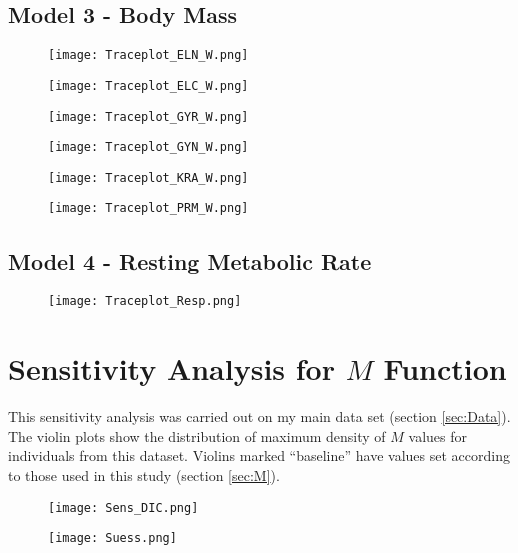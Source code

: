 \documentclass[12pt, titlepage]{article}
\begin{document}
\subsection{Model 3 - Body Mass}

\begin{figure}[H]
\texttt{[image: Traceplot\_ELN\_W.png]}
\end{figure}
\begin{figure}[H]
\texttt{[image: Traceplot\_ELC\_W.png]}
\end{figure}
\begin{figure}[H]
\texttt{[image: Traceplot\_GYR\_W.png]}
\end{figure}
\begin{figure}[H]
\texttt{[image: Traceplot\_GYN\_W.png]}
\end{figure}
\begin{figure}[H]
\texttt{[image: Traceplot\_KRA\_W.png]}
\end{figure}
\begin{figure}[H]
\texttt{[image: Traceplot\_PRM\_W.png]}
\end{figure}


\subsection{Model 4 - Resting Metabolic Rate}
\begin{figure}[H]
\texttt{[image: Traceplot\_Resp.png]}
\end{figure}

\pagebreak
\section{Sensitivity Analysis for $M$ Function}
\label{app:Sens}

This sensitivity analysis was carried out on my main data set (section \ref{sec:Data}).
The violin plots show the distribution of maximum density of $M$ values for individuals from this dataset.
Violins marked ``baseline'' have values set according to those used in this study (section \ref{sec:M}).

\begin{figure}[H]
\texttt{[image: Sens\_DIC.png]}
\end{figure}

\begin{figure}[H]
\texttt{[image: Suess.png]}
\end{figure}
\end{document}
